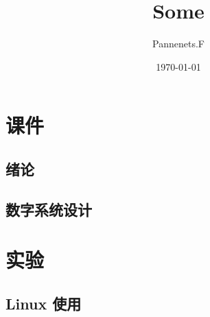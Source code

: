 \documentclass[cn,11pt,chinese,black,simple,device=ppt]{elegantbook}
\title{Some}
\author{Pannenets.F}
\date{\today}
\begin{document}
\maketitle
\frontmatter

\part{课件}

\chapter{绪论}



\chapter{数字系统设计}




\part{实验}

\chapter{Linux 使用}



\mainmatter
\end{document}
